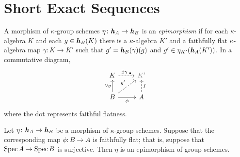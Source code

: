 \section{Short Exact Sequences}

\begin{defn}
    A morphism of $\kappa$-group schemes $\eta\colon\textrm{\boldmath$\mathit h$}_A\to\textrm{\boldmath$\mathit h$}_B$ is an \textsl{epimorphism} if for each $\kappa$-algebra $K$ and each $g\in\textrm{\boldmath$\mathit h$}_B(K)$ there is a $\kappa$-algebra $K'$ and a faithfully flat $\kappa$-algebra map $\gamma\colon K\to K'$ such that $g'=\textrm{\boldmath$\mathit h$}_B(\gamma)(g)$ and $g'\in\eta_{K'}(\textrm{\boldmath$\mathit h$}_A(K'))$. In a commutative diagram,
    \begin{equation}\label{tik:k-group-alg-epi}
        \begin{tikzcd}
            K
                    \arrow[r,"{\exists\gamma}\;\ff",dashed,
                                pos=0.5]
                &{\textcolor{gray}{K'}}\\
            B
                    \arrow[r,"\phi"']
                    \arrow[u,"{\forall g}"]
                    \arrow[ru,"g'",dashed]
                &A
                    \arrow[u,"f"',dashed]
        \end{tikzcd}
    \end{equation}
    where the dot represents faithful flatness.
\end{defn}

\begin{thm}\label{thm:ff-implies-epi}
    Let\/ $\eta\colon\textrm{\boldmath$\mathit h$}_A\to\textrm{\boldmath$\mathit h$}_B$ be a morphism of\/ $\kappa$-group schemes. Suppose that the corresponding map\/ $\phi\colon B\to A$ is faithfully flat; that is, suppose that\/ $\operatorname{Spec} A\to\operatorname{Spec} B$ is surjective. Then\/ $\eta$ is an epimorphism of group schemes.
\end{thm}

